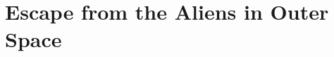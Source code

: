 \documentclass{beamer}
\begin{document}
{
%
\section{Escape from the Aliens in Outer Space}
\begin{frame}[plain]


\end{frame}
}
\end{document}
